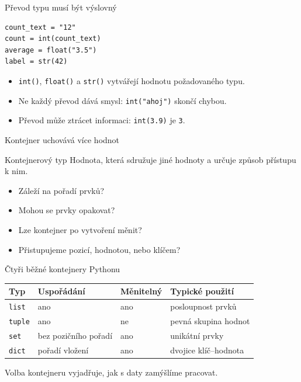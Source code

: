 \documentclass[aspectratio=169]{beamer}
\begin{document}
\begin{frame}[fragile]{Převod typu musí být výslovný}
\begin{lstlisting}[style=python]
count_text = "12"
count = int(count_text)
average = float("3.5")
label = str(42)
\end{lstlisting}
  \begin{itemize}
    \item \texttt{int()}, \texttt{float()} a \texttt{str()} vytvářejí hodnotu požadovaného typu.
    \item Ne každý převod dává smysl: \texttt{int("ahoj")} skončí chybou.
    \item Převod může ztrácet informaci: \texttt{int(3.9)} je \texttt{3}.
  \end{itemize}
\end{frame}

\begin{frame}{Kontejner uchovává více hodnot}
  \begin{block}{Kontejnerový typ}
    Hodnota, která sdružuje jiné hodnoty a určuje způsob přístupu k nim.
  \end{block}
  \begin{itemize}
    \item Záleží na pořadí prvků?
    \item Mohou se prvky opakovat?
    \item Lze kontejner po vytvoření měnit?
    \item Přistupujeme pozicí, hodnotou, nebo klíčem?
  \end{itemize}
\end{frame}

\begin{frame}{Čtyři běžné kontejnery Pythonu}
  \centering
  \small
  \begin{tabular}{llll}
    \textbf{Typ} & \textbf{Uspořádání} & \textbf{Měnitelný} & \textbf{Typické použití} \\
    \hline
    \texttt{list} & ano & ano & posloupnost prvků \\
    \texttt{tuple} & ano & ne & pevná skupina hodnot \\
    \texttt{set} & bez pozičního pořadí & ano & unikátní prvky \\
    \texttt{dict} & pořadí vložení & ano & dvojice klíč--hodnota \\
  \end{tabular}
  \par
  \normalsize
  \vspace{5mm}
  Volba kontejneru vyjadřuje, jak s daty zamýšlíme pracovat.
\end{frame}
\end{document}
